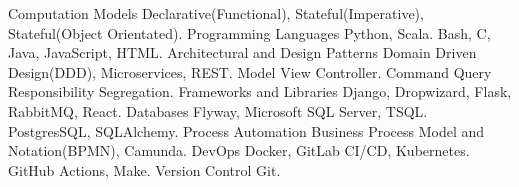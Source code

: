 \begin{cvskills}
  \cvskill
    {Computation Models} %
    { Declarative(Functional), Stateful(Imperative), Stateful(Object Orientated).} 
  \cvskill
    {Programming Languages} %
    {  Python, Scala. } 
  \cvskill
    {} %
    {  Bash, C, Java, JavaScript, HTML.} 
  \cvskill
    {Architectural and Design Patterns} %
    {  Domain Driven Design(DDD), Microservices, REST.}
  \cvskill
    {} %
    {  Model View Controller.} 
  \cvskill
    {} %
    {  Command Query Responsibility Segregation.} 
  \cvskill
    {Frameworks and Libraries} %
    {  Django, Dropwizard, Flask, RabbitMQ, React.} 
  \cvskill
  {Databases} %
  {  Flyway, Microsoft SQL Server, TSQL.} 
  \cvskill
  {} %
  {  PostgresSQL, SQLAlchemy.} 
  \cvskill
    {Process Automation}
    { Business Process Model and Notation(BPMN), Camunda.}
  \cvskill
    {DevOps} %
    { Docker, GitLab CI/CD, Kubernetes.} %
  \cvskill
    {} %
    {  GitHub Actions, Make.} 
  \cvskill
  {Version Control} %
  { Git.} %
\end{cvskills}
